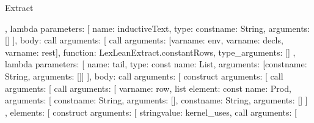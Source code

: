 \begin{lexlean}{Extract}
\begin{toolingmodule}
{{{{{{{{{{                            },
                            lambda{
                              parameters: [
                                {name: inductiveText, type: const{name: String, arguments: []}}
                              ],
                              body: call{
                                arguments: [
                                  call{
                                    arguments: [var{name: env}, var{name: decls}, var{name: rest}],
                                    function: LexLeanExtract.constantRows,
                                    type_arguments: []
                                  },
                                  lambda{
                                    parameters: [
                                      {
                                        name: tail,
                                        type: const{
                                          name: List,
                                          arguments: [const{name: String, arguments: []}]
                                        }
                                      }
                                    ],
                                    body: call{
                                      arguments: [
                                        construct{
                                          arguments: [
                                            call{
                                              arguments: [
                                                call{
                                                  arguments: [
                                                    var{name: row},
                                                    list{
                                                      element: const{
                                                        name: Prod,
                                                        arguments: [
                                                          const{name: String, arguments: []},
                                                          const{name: String, arguments: []}
                                                        ]
                                                      },
                                                      elements: [
                                                        construct{
                                                          arguments: [
                                                            string{value: kernel_uses},
                                                            call{
                                                              arguments: [
}}}}}}}}}}}}}}}}}}}
\end{toolingmodule}
\end{lexlean}
